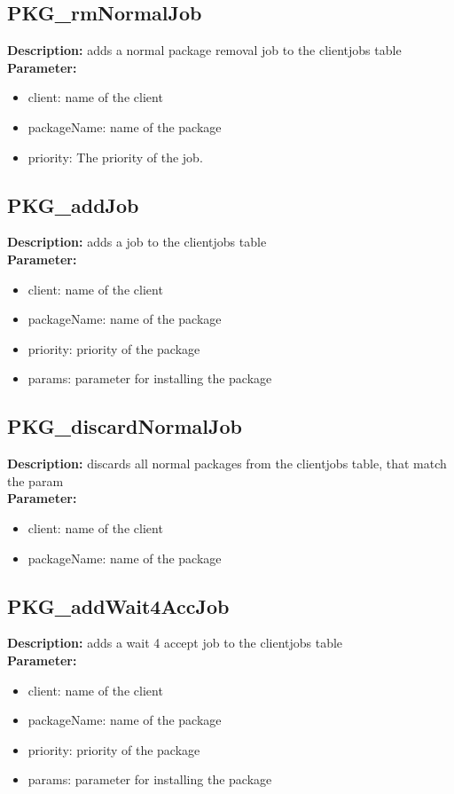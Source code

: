 \subsection{PKG\_rmNormalJob}
\textbf{Description:} adds a normal package removal job to the clientjobs table\\
\textbf{Parameter:}
\begin{itemize}
\item client: name of the client
\item packageName: name of the package
\item priority: The priority of the job.
\end{itemize}

\subsection{PKG\_addJob}
\textbf{Description:} adds a job to the clientjobs table\\
\textbf{Parameter:}
\begin{itemize}
\item client: name of the client
\item packageName: name of the package
\item priority: priority of the package
\item params: parameter for installing the package
\end{itemize}

\subsection{PKG\_discardNormalJob}
\textbf{Description:} discards all normal packages from the clientjobs table, that match the param\\
\textbf{Parameter:}
\begin{itemize}
\item client: name of the client
\item packageName: name of the package
\end{itemize}

\subsection{PKG\_addWait4AccJob}
\textbf{Description:} adds a wait 4 accept job to the clientjobs table\\
\textbf{Parameter:}
\begin{itemize}
\item client: name of the client
\item packageName: name of the package
\item priority: priority of the package
\item params: parameter for installing the package
\end{itemize}

